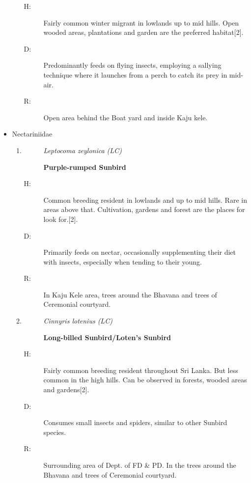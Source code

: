 \begin{itemize}
\begin{enumerate}
\begin{description}%
\item[H: ]%
Fairly common winter migrant in lowlands up to mid hills. Open wooded areas, plantations and garden are the preferred habitat{[}2{]}.%
\item[D: ]%
Predominantly feeds on flying insects, employing a sallying technique where it launches from a perch to catch its prey in mid{-}air.%
\item[R: ]%
Open area behind the Boat yard and inside Kaju kele.%
\end{description}%
\end{enumerate}%
\item%
Nectariniidae%
\begin{enumerate}%
\item%
\begin{description}%
\item[]%
\textit{Leptocoma zeylonica (LC)}%
\item[]%
\textbf{Purple{-}rumped Sunbird}%
\end{description}%
\begin{description}%
\item[H: ]%
Common breeding resident in lowlands and up to mid hills. Rare in areas above that. Cultivation, gardens and forest are the places for look for.{[}2{]}.%
\item[D: ]%
Primarily feeds on nectar, occasionally supplementing their diet with insects, especially when tending to their young.%
\item[R: ]%
In Kaju Kele area, trees around the Bhavana and trees of Ceremonial courtyard. %
\end{description}%
\item%
\begin{description}%
\item[]%
\textit{Cinnyris lotenius (LC)}%
\item[]%
\textbf{Long{-}billed Sunbird/Loten's Sunbird}%
\end{description}%
\begin{description}%
\item[H: ]%
Fairly common breeding resident throughout Sri Lanka. But less common in the high hills. Can be observed in forests, wooded areas and gardens{[}2{]}.%
\item[D: ]%
Consumes small insects and spiders, similar to other Sunbird species.%
\item[R: ]%
Surrounding area of Dept. of FD \& PD. In the trees around the Bhavana and trees of Ceremonial courtyard.%

\end{description}
\end{enumerate}
\end{itemize}
